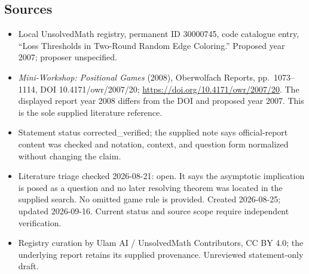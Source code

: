 \documentclass[11pt]{article}
\begin{document}
\subsection{Sources}
\begin{itemize}
\item Local UnsolvedMath registry, permanent ID 30000745, code catalogue entry, ``Loss Thresholds in Two-Round Random Edge Coloring.'' Proposed year 2007; proposer unspecified.
\item \emph{Mini-Workshop: Positional Games} (2008), Oberwolfach Reports, pp.\ 1073--1114, DOI 10.4171/owr/2007/20; \url{https://doi.org/10.4171/owr/2007/20}. The displayed report year 2008 differs from the DOI and proposed year 2007. This is the sole supplied literature reference.
\item Statement status corrected\_verified; the supplied note says official-report content was checked and notation, context, and question form normalized without changing the claim.
\item Literature triage checked 2026-08-21: open. It says the asymptotic implication is posed as a question and no later resolving theorem was located in the supplied search. No omitted game rule is provided. Created 2026-08-25; updated 2026-09-16. Current status and source scope require independent verification.
\item Registry curation by Ulam AI / UnsolvedMath Contributors, CC BY 4.0; the underlying report retains its supplied provenance. Unreviewed statement-only draft.
\end{itemize}
\end{document}
